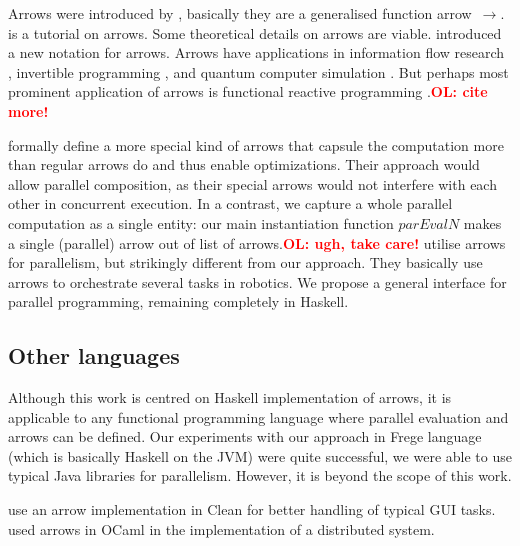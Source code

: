 \documentclass{jfp1}
\newcommand{\Varid}[1]{\mathit{#1}}
\renewcommand{\cite}[1]{\citep{#1}}
\newcommand{\comm}[2]{\textcolor{red}{\bfseries #1: #2}}
\newcommand{\olcomment}[1]{\comm{OL}{#1}}
\begin{document}
Arrows were introduced by \citet{HughesArrows}, basically they are a generalised function arrow~\ensuremath{\to }. \citet{Hughes2005} is a tutorial on arrows. Some theoretical details on arrows \cite{jacobs_heunen_hasuo_2009,LINDLEY201197,ATKEY201119} are viable. \citet{Paterson:2001:NNA:507669.507664} introduced a new notation for arrows. Arrows have applications in information flow research \cite{1648705,LI20101974,Russo:2008:LLI:1411286.1411289}, invertible programming \cite{Alimarine:2005:BAA:1088348.1088357}, and quantum computer simulation \cite{vizzotto_altenkirch_sabry_2006}. But perhaps most prominent application of arrows is functional reactive programming \cite{Hudak2003}.\olcomment{cite more!}

\citet{Liu:2009:CCA:1631687.1596559} formally define a more special kind of arrows that capsule the computation more than regular arrows do and thus enable optimizations. Their approach would allow parallel composition, as their special arrows would not interfere with each other in concurrent execution. In a contrast, we capture a whole parallel computation as a single entity: our main instantiation function \ensuremath{\Varid{parEvalN}} makes a single (parallel) arrow out of list of arrows.\olcomment{ugh, take care!}
\citet{Huang2007} utilise arrows for parallelism, but strikingly different from our approach. They basically use arrows to orchestrate several tasks in robotics. We propose a general interface for parallel programming, remaining completely in Haskell.

\subsection{Other languages}

Although this work is centred on Haskell implementation of arrows, it is applicable to any functional programming language where parallel evaluation and arrows can be defined. Our experiments with our approach in Frege language (which is basically Haskell on the JVM) were quite successful, we were able to use typical Java libraries for parallelism. However, it is beyond the scope of this work.

\citet{achten2004arrows,achten2007arrow} use an arrow implementation in Clean for better handling of typical GUI tasks. \citet{Dagand:2009:ORD:1481861.1481870} used arrows in OCaml in the implementation of a distributed system.


\end{document}
